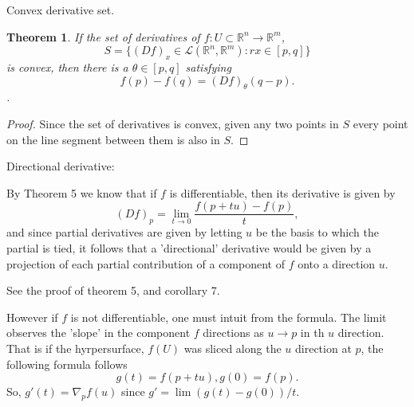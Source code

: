 \documentclass[letter]{article}
\newtheorem{theorem}{Theorem}
\newenvironment{menumerate}{%
  \edef\backupindent{\the\parindent}%
  \enumerate%
  \setlength{\parindent}{\backupindent}%
}{\endenumerate}
\begin{document}
\begin{menumerate}
\begin{menumerate}
        \item Convex derivative set.
        \begin{theorem}
            If the set of derivatives of $f: U \subset \mathbb{R}^n \to \mathbb{R}^m$,
            \begin{equation}
                S = \{(Df)_x \in \mathcal{L}(\mathbb{R}^n, \mathbb{R}^m) : rx \in [p,q]\}
            \end{equation}
            is convex, then there is a $\theta \in [p,q]$ satisfying 
            \begin{equation}
                f(p) - f(q) = (Df)_\theta(q-p).        
            \end{equation}.
        \end{theorem}
        \begin{proof}
            Since the set of derivatives is convex, given any two points in $S$ every point on the line segment between them is also in $S.$

        \end{proof}

    \end{menumerate}
    \item Directional derivative:
        \begin{menumerate}
            \item By Theorem 5 we know that if $f$ is differentiable, then its derivative is given by 
            \begin{equation}
            (Df)_p = \lim_{t\to 0}\frac{f(p+tu)-f(p)}{t},
            \end{equation}
            and since partial derivatives are given by letting $u$ be the basis to which the partial is tied, it follows that a 'directional' derivative would be given by a projection of each partial contribution of a component of $f$ onto a direction $u$. 

            See the proof of theorem 5, and corollary 7.

            However if $f$ is not differentiable, one must intuit from the formula. The limit observes the 'slope' in the component $f$ directions as $u \to p$ in th $u$ direction. That is if the hyrpersurface, $f(U)$ was sliced along the $u$ direction at $p$,
            the following formula follows
            \begin{equation}
                g(t) = f(p+tu),g(0) = f(p).
            \end{equation}
            So, $g'(t) = \nabla_pf(u)$ since $g' = \lim (g(t)-g(0))/t.$


\end{menumerate}
\end{menumerate}
\end{document}
